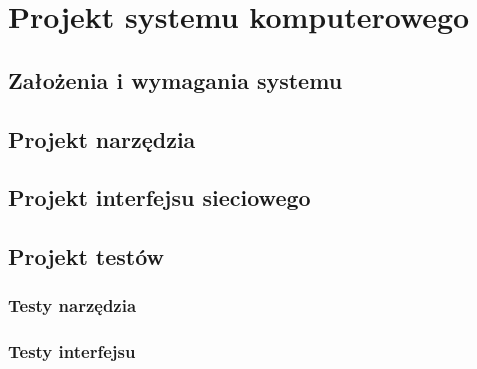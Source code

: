 \documentclass[../thesis.tex]{subfiles}
\begin{document}
\pagestyle{plain}
\chapter{Projekt systemu komputerowego}
\section{Założenia i wymagania systemu}
\section{Projekt narzędzia}
\section{Projekt interfejsu sieciowego}
\section{Projekt testów}
\subsection{Testy narzędzia}
\subsection{Testy interfejsu}
\end{document}
